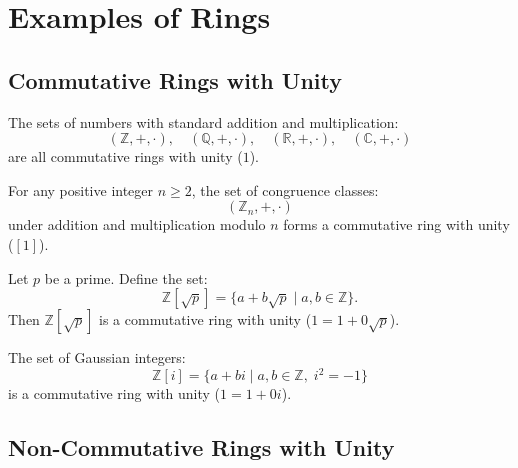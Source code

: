 \section{Examples of Rings}

\subsection{Commutative Rings with Unity}

\begin{example}
The sets of numbers with standard addition and multiplication:
\[
(\mathbb{Z}, +, \cdot), \quad (\mathbb{Q}, +, \cdot), \quad (\mathbb{R}, +, \cdot), \quad (\mathbb{C}, +, \cdot)
\]
are all commutative rings with unity ($1$).
\end{example}

\begin{example}
For any positive integer $n \ge 2$, the set of congruence classes:
\[
(\mathbb{Z}_n, +, \cdot)
\]
under addition and multiplication modulo $n$ forms a commutative ring with unity ($[1]$).
\end{example}

\begin{example}
Let $p$ be a prime. Define the set:
\[
\mathbb{Z}[\sqrt{p}] = \{a + b\sqrt{p} \mid a, b \in \mathbb{Z}\}.
\]
Then $\mathbb{Z}[\sqrt{p}]$ is a commutative ring with unity ($1 = 1 + 0\sqrt{p}$).
\end{example}

\begin{example}
The set of Gaussian integers:
\[
\mathbb{Z}[i] = \{a + bi \mid a, b \in \mathbb{Z}, \; i^2 = -1\}
\]
is a commutative ring with unity ($1 = 1 + 0i$).
\end{example}

\subsection{Non-Commutative Rings with Unity}

